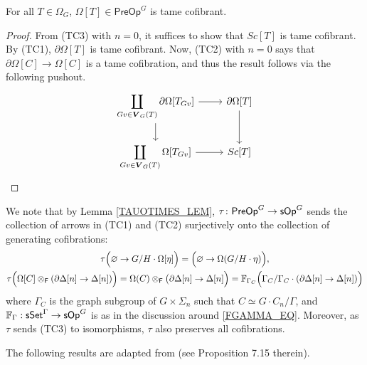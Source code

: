 \documentclass[a4paper,10pt
,draft
]{article}%
\renewcommand{\1}{\eta}%
\begin{document}
\begin{lemma}
      \label{OMEGATTAME_LEM}
      For all $T \in \Omega_G$, $\Omega[T] \in \mathsf{PreOp}^G$ is tame cofibrant.
\end{lemma}
\begin{proof}
      From (TC3) with $n=0$, it suffices to show that $Sc[T]$ is tame cofibrant.
      By (TC1), $\partial\Omega[T]$ is tame cofibrant.
      Now, (TC2) with $n=0$ says that $\partial \Omega[C] \to \Omega[C]$ is a tame cofibration,
      and thus the result follows via the following pushout.
      \[
            \begin{tikzcd}
                  \displaystyle{
                    \coprod_{Gv \in \boldsymbol{V}_G(T)} \partial\Omega[T_{Gv}]
                  }
                  \arrow[d] \arrow[r]
                  &
                  \partial\Omega[T] \arrow[d]
                  \\
                  \displaystyle{
                    \coprod_{Gv \in \boldsymbol{V}_G(T)} \Omega[T_{Gv}]
                  }
                  \arrow[r]
                  &
                  Sc[T]
            \end{tikzcd}
            \]
\end{proof}


\begin{remark}
      \label{TAUCOFIB_REM}        
      We note that by Lemma \ref{TAUOTIMES_LEM}, $\tau \colon \mathsf{PreOp}^G \to \mathsf{sOp}^G$
      sends the collection of arrows in (TC1) and (TC2) surjectively onto the collection of generating cofibrations:
      \begin{gather*}
            \tau\Big(\varnothing \to G/H \cdot \Omega[\eta]\Big) = \Big(\varnothing \to \Omega(G/H \cdot \eta)\Big),
            \\
            \tau\Big(\Omega[C] \otimes_{\mathsf{F}} (\partial \Delta[n] \to \Delta[n])\Big) =
            \Omega(C) \otimes_{\mathsf{F}} \big(\partial \Delta[n] \to \Delta[n]\Big) =
            \mathbb F_{\Gamma_C} \Big( \Gamma_C / \Gamma_C \cdot (\partial \Delta[n] \to \Delta[n]) \Big)
      \end{gather*}
      where $\Gamma_C$ is the graph subgroup of $G \times \Sigma_n$ such that $C \simeq G \cdot C_n / \Gamma$, and
      $\mathbb F_\Gamma: \mathsf{sSet}^\Gamma \to \mathsf{sOp}^G$ is as in the discussion around \eqref{FGAMMA_EQ}.
      Moreover, as $\tau$ sends (TC3) to isomorphisms, $\tau$ also preserves all cofibrations.
\end{remark}

The following results are adapted from \cite{JT07} (see Proposition 7.15 therein). 
\end{document}
